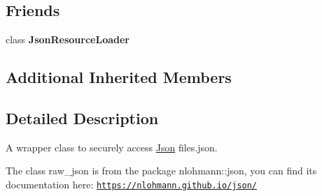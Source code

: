 \subsection*{Friends}
\begin{DoxyCompactItemize}
\item 
\mbox{\label{classTarbora_1_1Json_aee50c6631e13cfeca7c547d5cba72f8c}} 
class {\bfseries Json\+Resource\+Loader}
\end{DoxyCompactItemize}
\subsection*{Additional Inherited Members}


\subsection{Detailed Description}
A wrapper class to securely access \hyperlink{classTarbora_1_1Json}{Json} files.\+json. 

The class raw\+\_\+json is from the package nlohmann\+::json, you can find its documentation here\+: \href{https://nlohmann.github.io/json/}{\tt https\+://nlohmann.\+github.\+io/json/}



